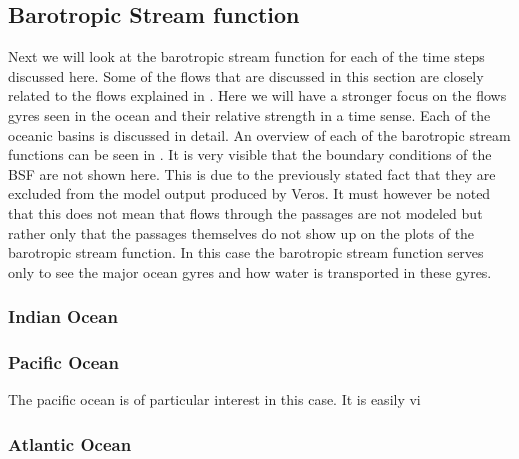 \subsection{Barotropic Stream function}
\label{sec:BSF}

Next we will look at the barotropic stream function for each of the time steps discussed here. Some of the flows that are discussed in this section are closely related to the flows explained in . Here we will have a stronger focus on the flows gyres seen in the ocean and their relative strength in a time sense. Each of the oceanic basins is discussed in detail. An overview of each of the barotropic stream functions can be seen in . It is very visible that the boundary conditions of the BSF are not shown here. This is due to the previously stated fact that they are excluded from the model output produced by Veros. It must however be noted that this does not mean that flows through the passages are not modeled but rather only that the passages themselves do not show up on the plots of the barotropic stream function. In this case the barotropic stream function serves only to see the major ocean gyres and how water is transported in these gyres.

\subsubsection{Indian Ocean}

\subsubsection{Pacific Ocean}
The pacific ocean is of particular interest in this case. It is easily vi
\subsubsection{Atlantic Ocean}



